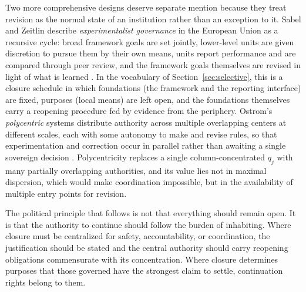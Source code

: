 Two more comprehensive designs deserve separate mention because they treat revision as the normal state of an institution rather than an exception to it. Sabel and Zeitlin describe \emph{experimentalist governance} in the European Union as a recursive cycle: broad framework goals are set jointly, lower-level units are given discretion to pursue them by their own means, units report performance and are compared through peer review, and the framework goals themselves are revised in light of what is learned \cite{sabelzeitlin2008}. In the vocabulary of Section~\ref{sec:selective}, this is a closure schedule in which foundations (the framework and the reporting interface) are fixed, purposes (local means) are left open, and the foundations themselves carry a reopening procedure fed by evidence from the periphery. Ostrom's \emph{polycentric} systems distribute authority across multiple overlapping centers at different scales, each with some autonomy to make and revise rules, so that experimentation and correction occur in parallel rather than awaiting a single sovereign decision \cite{ostrom2010}. Polycentricity replaces a single column-concentrated $q_j$ with many partially overlapping authorities, and its value lies not in maximal dispersion, which would make coordination impossible, but in the availability of multiple entry points for revision.

The political principle that follows is not that everything should remain open. It is that the authority to continue should follow the burden of inhabiting. Where closure must be centralized for safety, accountability, or coordination, the justification should be stated and the central authority should carry reopening obligations commensurate with its concentration. Where closure determines purposes that those governed have the strongest claim to settle, continuation rights belong to them.
